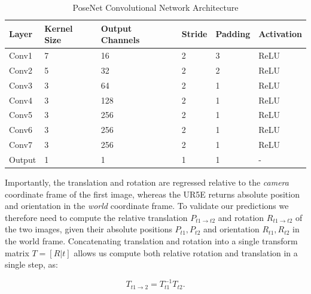 \begin{table}[h]

    \caption{PoseNet Convolutional Network Architecture}
    \centering
    \begin{tabular}{@{}llllll@{}}
        \toprule
        Layer               & Kernel Size   & Output Channels   & Stride    & Padding   & Activation\\ 
        \midrule
        Conv1               & 7             & 16                & 2         & 3         & ReLU      \\ 
        Conv2               & 5             & 32                & 2         & 2         & ReLU      \\ 
        Conv3               & 3             & 64                & 2         & 1         & ReLU      \\ 
        Conv4               & 3             & 128               & 2         & 1         & ReLU      \\
        Conv5               & 3             & 256               & 2         & 1         & ReLU      \\
        Conv6               & 3             & 256               & 2         & 1         & ReLU      \\
        Conv7               & 3             & 256               & 2         & 1         & ReLU      \\
        Output              & 1             & 1                 & 1         & 1         & -         \\ 
        \bottomrule
    \end{tabular}
    \label{posenet-layers}
\end{table}

Importantly, the translation and rotation are regressed relative to the \textit{camera} coordinate frame of the first image, whereas the UR5E returns absolute position and orientation in the \textit{world} coordinate frame. To validate our predictions we therefore need to compute the relative translation $P_{t1 \rightarrow t2}$ and rotation $R_{t1 \rightarrow t2}$ of the two images, given their absolute positions $P_{t1}, P_{t2}$ and orientation $R_{t1}, R_{t2}$ in the world frame. Concatenating translation and rotation into a single transform matrix $T = [R|t]$ allows us compute both relative rotation and translation in a single step, as:

\begin{equation}
T_{t1 \rightarrow 2} = T_{t1}^{-1} T_{t2}.
\end{equation}

